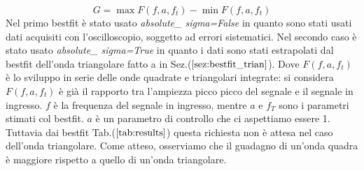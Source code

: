 \documentclass{article}
\begin{document}
    
      \begin{equation}
        G=\max{F(f,a,f_t)}-\min{F(f,a,f_t)}
        \label{eq:gain}
    \end{equation}
        Nel primo bestfit è stato usato \emph{absolute\_ sigma=False} in quanto  
      sono stati usati dati acquisiti con l'oscilloscopio, soggetto ad errori sistematici.
      Nel secondo caso è stato usato \emph{absolute\_ sigma=True} in quanto i dati sono 
      stati estrapolati dal bestfit dell'onda triangolare fatto a in 
      Sez.($\ref{sez:bestfit_trian}$).
        Dove $F(f,a,f_t)$ è lo sviluppo in serie delle onde quadrate e triangolari integrate: si considera
        $F(f,a,f_t)$ è già il rapporto tra l'ampiezza picco picco del segnale e il segnale in ingresso.
        $f$ è la frequenza del segnale in ingresso, mentre $a$ e $f_T$ sono i parametri 
        stimati col bestfit. $a$ è un parametro di controllo che ci 
        aspettiamo essere 1. Tuttavia dai bestfit Tab.($\ref{tab:results}$) questa richiesta non è attesa nel caso dell'onda triangolare.
        Come atteso, osserviamo che il guadagno di un'onda quadra è maggiore rispetto a quello di un'onda triangolare. 
\end{document}
